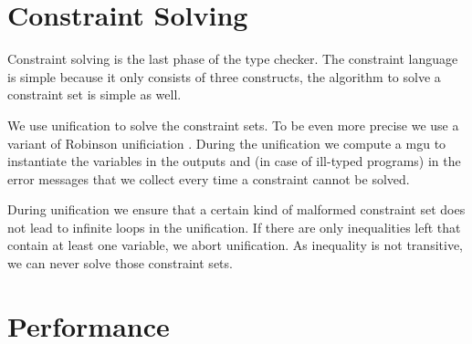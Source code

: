 \section{Constraint Solving}
\label{sec:constraint-solving}
Constraint solving is the last phase of the type checker. The
constraint language is simple because it only consists of three
constructs, the algorithm to solve a constraint set is simple as well.

We use unification to solve the constraint sets. To be even more
precise we use a variant of Robinson unificiation
. During the unification we compute a \gls{mgu} to
instantiate the variables in the outputs and (in case of ill-typed
programs) in the error messages that we collect every time a
constraint cannot be solved.

During unification we ensure that a certain kind of malformed
constraint set does not lead to infinite loops in the unification. If
there are only inequalities left that contain at least one variable,
we abort unification. As inequality is not transitive, we can never
solve those constraint sets.
\section{Performance}
\label{sec:performance}

